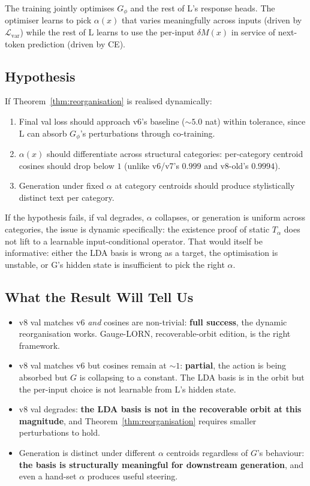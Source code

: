 \documentclass[11pt, a4paper]{article}
\theoremstyle{plain}
\theoremstyle{definition}
\theoremstyle{remark}
\begin{document}
The training jointly optimises $G_\phi$ and the rest of L's response heads.
The optimiser learns to pick $\alpha(x)$ that varies meaningfully across inputs (driven by $\mathcal{L}_{\text{var}}$) while the rest of L learns to use the per-input $\delta M(x)$ in service of next-token prediction (driven by CE).

\subsection{Hypothesis}

If Theorem~\ref{thm:reorganisation} is realised dynamically:
\begin{enumerate}[nosep]
\item Final val loss should approach v6's baseline ($\sim 5.0$ nat) within tolerance, since L can absorb $G_\phi$'s perturbations through co-training.
\item $\alpha(x)$ should differentiate across structural categories: per-category centroid cosines should drop below $1$ (unlike v6/v7's $0.999$ and v8-old's $0.9994$).
\item Generation under fixed $\alpha$ at category centroids should produce stylistically distinct text per category.
\end{enumerate}
If the hypothesis fails, if val degrades, $\alpha$ collapses, or generation is uniform across categories, the issue is dynamic specifically: the existence proof of static $T_\alpha$ does not lift to a learnable input-conditional operator.
That would itself be informative: either the LDA basis is wrong as a target, the optimisation is unstable, or G's hidden state is insufficient to pick the right $\alpha$.

\subsection{What the Result Will Tell Us}

\begin{itemize}[nosep]
\item v8 val matches v6 \emph{and} cosines are non-trivial: \textbf{full success}, the dynamic reorganisation works. Gauge-LORN, recoverable-orbit edition, is the right framework.
\item v8 val matches v6 but cosines remain at $\sim 1$: \textbf{partial}, the action is being absorbed but $G$ is collapsing to a constant. The LDA basis is in the orbit but the per-input choice is not learnable from L's hidden state.
\item v8 val degrades: \textbf{the LDA basis is not in the recoverable orbit at this magnitude}, and Theorem~\ref{thm:reorganisation} requires smaller perturbations to hold.
\item Generation is distinct under different $\alpha$ centroids regardless of $G$'s behaviour: \textbf{the basis is structurally meaningful for downstream generation}, and even a hand-set $\alpha$ produces useful steering.
\end{itemize}
\end{document}
